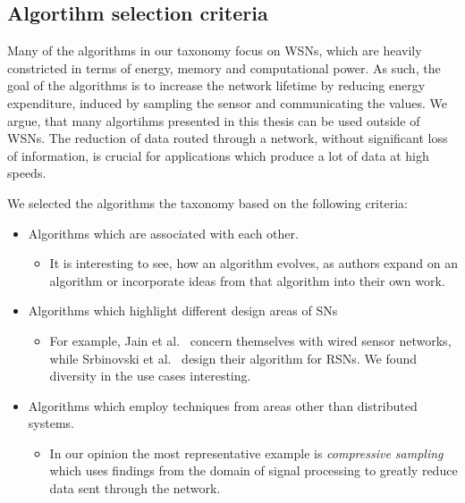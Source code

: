 \subsection{Algortihm selection criteria}
\label{sec:Algortihm selection criteria}

Many of the algorithms in our taxonomy focus on \acp{WSN}, which are heavily
constricted in terms of energy, memory and computational power. As such, the
goal of the algorithms is to increase the network lifetime by reducing energy
expenditure, induced by sampling the sensor and communicating the values. We
argue, that many algortihms presented in this thesis can be used outside of
\acp{WSN}. The reduction of data routed through a network, without significant
loss of information, is crucial for applications which produce a lot of data at
high speeds.

We selected the algorithms the taxonomy based on the following criteria:

\begin{itemize}
    \item Algorithms which are associated with each other.
    \begin{itemize}
        \item It is interesting to see, how an algorithm evolves, as authors
        expand on an algorithm or incorporate ideas from that algorithm into
        their own work.
    \end{itemize}
    \item Algorithms which highlight different design areas of \acp{SN}
    \begin{itemize}
        \item For example, Jain et al.~\cite{jain2004adaptive} concern
        themselves with wired sensor networks, while Srbinovski et
        al.~\cite{srbinovski2016energy} design their algorithm for \acp{RSN}.
        We found diversity in the use cases interesting.
    \end{itemize}
    \item Algorithms which employ techniques from areas other than distributed
    systems. 
    \begin{itemize}
        \item In our opinion the most representative example is
        \textit{compressive sampling} which uses findings from the domain of
        signal processing to greatly reduce data sent through the network.
    \end{itemize}
\end{itemize}

